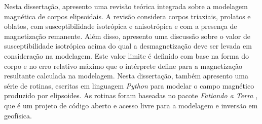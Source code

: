 Nesta dissertação, apresento uma revisão teórica integrada sobre a modelagem magnética de corpos elipsoidais. A revisão considera corpos triaxiais, prolatos e oblatos, com susceptibilidade isotrópica e anisotrópica e com a presença de magnetização remanente. Além disso, apresento uma discussão sobre o valor de susceptibilidade isotrópica acima do qual a desmagnetização deve ser levada em consideração na modelagem. Este valor limite é definido com base na forma do corpo e no erro relativo máximo que o intérprete define para a magnetização resultante calculada na modelagem. Nesta dissertação, também apresento uma série de rotinas, escritas em linguagem \textit{Python} para modelar o campo magnético produzido por elipsoides. As rotinas foram baseadas no pacote \textit{Fatiando a Terra} \citep{uieda-proc-scipy-2013}, que é um projeto de código aberto e acesso livre para a modelagem e inversão em geofísica.
